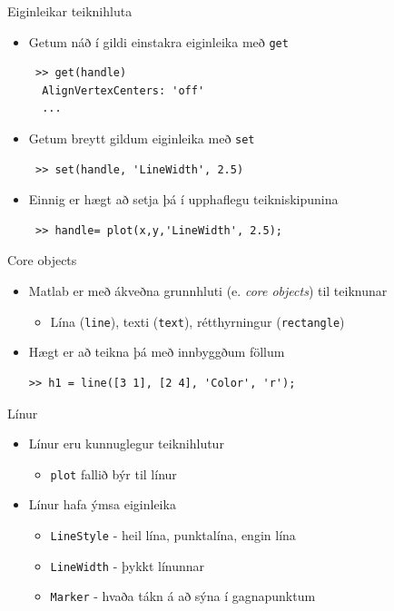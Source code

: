 \documentclass[handout]{beamer}
\begin{document}
\begin{frame}[fragile]{Eiginleikar teiknihluta}
\begin{itemize}
 \item Getum náð í gildi einstakra eiginleika með \texttt{get}
 \begin{verbatim}
 >> get(handle)
  AlignVertexCenters: 'off'
  ...
 \end{verbatim}
 \item Getum breytt gildum eiginleika með \texttt{set}
 \begin{verbatim}
 >> set(handle, 'LineWidth', 2.5)
 \end{verbatim}
 \item Einnig er hægt að setja þá í upphaflegu teikniskipunina
 \begin{verbatim}
 >> handle= plot(x,y,'LineWidth', 2.5);
 \end{verbatim}
\end{itemize}
\end{frame}

\begin{frame}[fragile]{Core objects}
\begin{itemize}
 \item Matlab er með ákveðna grunnhluti (e. \emph{core objects}) til teiknunar
 \begin{itemize}
  \item Lína (\texttt{line}), texti (\texttt{text}), rétthyrningur (\texttt{rectangle})
 \end{itemize}
 \item Hægt er að teikna þá með innbyggðum föllum
\begin{verbatim}
>> h1 = line([3 1], [2 4], 'Color', 'r');
\end{verbatim}
\end{itemize}
\end{frame}

\begin{frame}{Línur}
\begin{itemize}
 \item Línur eru kunnuglegur teiknihlutur
 \begin{itemize}
  \item \texttt{plot} fallið býr til línur
 \end{itemize}
 \item Línur hafa ýmsa eiginleika
 \begin{itemize}
  \item \texttt{LineStyle} - heil lína, punktalína, engin lína
  \item \texttt{LineWidth} - þykkt línunnar
  \item \texttt{Marker} - hvaða tákn á að sýna í gagnapunktum
 \end{itemize}
\end{itemize}
\end{frame}
\end{document}

